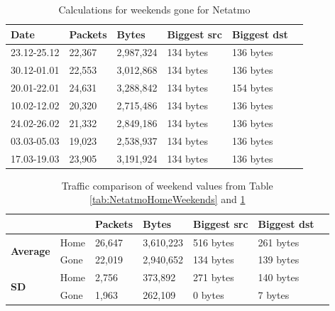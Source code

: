 \begin{table}[H]
    \centering
    \caption{Calculations for weekends gone for Netatmo}
    \begin{tabular}{|l|l|l|l|l|l|}
    \hline
        \textbf{Date} & \textbf{Packets} & \textbf{Bytes} & \textbf{Biggest src} & \textbf{Biggest dst} \\ \hline
        23.12-25.12   & 22,367           & 2,987,324      & 134 bytes            & 136 bytes            \\ \hline
        30.12-01.01   & 22,553           & 3,012,868      & 134 bytes            & 136 bytes            \\ \hline
        20.01-22.01   & 24,631           & 3,288,842      & 134 bytes            & 154 bytes            \\ \hline
        10.02-12.02   & 20,320           & 2,715,486      & 134 bytes            & 136 bytes            \\ \hline
        24.02-26.02   & 21,332           & 2,849,186      & 134 bytes            & 136 bytes            \\ \hline
        03.03-05.03   & 19,023           & 2,538,937      & 134 bytes            & 136 bytes            \\ \hline
        17.03-19.03   & 23,905           & 3,191,924      & 134 bytes            & 136 bytes            \\ \hline
    \end{tabular}
    \label{tab:NetatmoGoneWeekends}
\end{table}

\begin{table}[H]
    \centering
    \caption{Traffic comparison of weekend values from Table \ref{tab:NetatmoHomeWeekends} and \ref{tab:NetatmoGoneWeekends}}
    \begin{tabular}{ll|l|l|l|l|l|}
        \cline{3-6}
        &      & \textbf{Packets} & \textbf{Bytes} & \textbf{Biggest src} & \textbf{Biggest dst} \\ \hline
    \multicolumn{1}{|l|}{\multirow{2}{*}{\textbf{Average}}} & Home & 26,647          & 3,610,223    & 516 bytes                 & 261 bytes                 \\ \cline{2-6} 
    \multicolumn{1}{|l|}{}                              & Gone & 22,019          & 2,940,652    & 134 bytes                    & 139 bytes                 \\ \hline
    \multicolumn{1}{|l|}{\multirow{2}{*}{\textbf{\gls{SD}}}} & Home & 2,756            & 373,892      & 271 bytes                 & 140 bytes                 \\ \cline{2-6} 
    \multicolumn{1}{|l|}{}                             & Gone & 1,963            & 262,109      & 0 bytes                   & 7 bytes                   \\ \hline
    \end{tabular}
    \label{tab:NetatmoWeekends}
\end{table}

